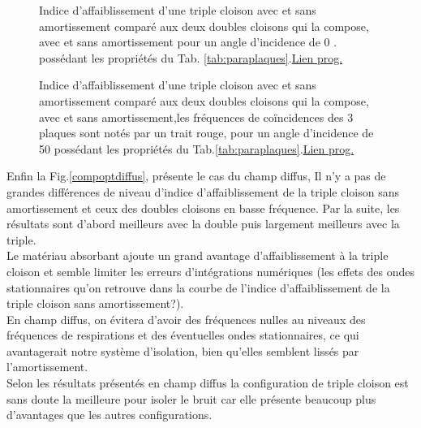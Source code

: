\documentclass[12pt,foolscap]{report}
\begin{document}
	
	\begin{figure}[h]
		\begin{minipage}[c]{.45\linewidth}
			\begin{center}
				\caption{Indice d'affaiblissement d'une triple cloison avec et sans amortissement comparé aux deux doubles cloisons qui la compose, avec et sans amortissement pour un angle d'incidence de 0 \degres. possédant les propriétés du  Tab. \ref{tab:paraplaques}.\href{https://github.com/Nuopel/Encoffrement/blob/master/Programme/comparaison_cloison_amortissement_TransMat.m}{Lien prog.}}
				\label{comp3_0}
			\end{center}
		\end{minipage}
		\hfill
		\begin{minipage}[c]{.45\linewidth}
			\begin{center}
				\caption{Indice d'affaiblissement d'une triple cloison avec et sans amortissement comparé aux deux doubles cloisons qui la compose, avec et sans amortissement,les fréquences de coïncidences des 3 plaques sont notés par un trait rouge, pour un angle d'incidence de 50 \degres possédant les propriétés du Tab.\ref{tab:paraplaques}.\href{https://github.com/Nuopel/Encoffrement/blob/master/Programme/comparaison_cloison_amortissement_TransMat.m}{Lien prog.}}
				\label{comp3_50}
			\end{center}
		\end{minipage}
	\end{figure}
	Enfin la Fig.\ref{compoptdiffus}, présente le cas du champ diffus,
	Il n'y a pas de grandes différences de niveau d'indice d'affaiblissement de la triple cloison sans amortissement et ceux des doubles cloisons en basse fréquence. Par la suite, les résultats sont d'abord meilleurs avec la double puis largement meilleurs avec la triple.\\ 
	Le matériau absorbant ajoute un grand avantage d'affaiblissement à la triple cloison et semble limiter les erreurs d'intégrations numériques (les effets des ondes stationnaires qu'on retrouve dans la courbe de l'indice d'affaiblissement de la triple cloison sans amortissement?).\\ 
	En champ diffus, on évitera d'avoir des fréquences nulles au niveaux des fréquences de respirations et des éventuelles ondes stationnaires, ce qui avantagerait notre système d'isolation, bien qu'elles semblent lissés par l'amortissement. \\
	Selon les résultats présentés en champ diffus la configuration de triple cloison est sans doute la meilleure pour isoler le bruit car elle présente beaucoup plus d'avantages que les autres configurations.\\
	
\end{document}
